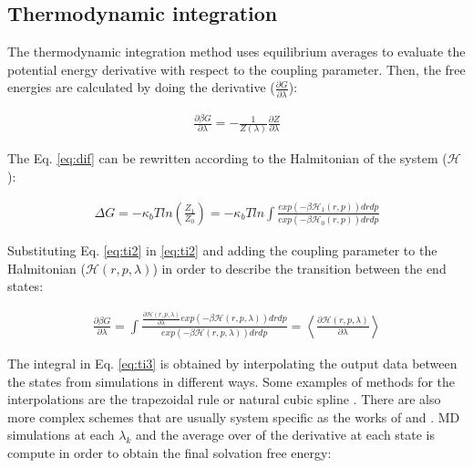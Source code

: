 \subsection{Thermodynamic integration}

The thermodynamic integration method \cite{kirkwood1935} uses equilibrium averages to evaluate the potential energy derivative with respect to the coupling parameter. Then, the free energies are calculated by  doing the derivative ($\frac{\partial G}{\partial \lambda} $):

\begin{equation}
\label{eq:ti1}
\begin{aligned}
	\frac{\partial \beta G}{\partial \lambda} = - \frac{1}{Z (\lambda)}\frac{\partial Z}{\partial \lambda}
\end{aligned}
\end{equation}

The Eq. \eqref{eq:dif} can be rewritten according to the Halmitonian of the system ($\mathcal{H}$):

\begin{equation}
\label{eq:ti2}
\begin{aligned}
\Delta G = - \kappa_{b}T ln \left( \frac{Z_{1}}{Z_{0}}\right) = -\kappa_{b}T ln \int \frac{exp(-\beta \mathcal{H} _{1}(r,p)) dr dp}{exp(-\beta \mathcal{H} _{0}(r,p)) dr dp}
\end{aligned}
\end{equation}

Substituting Eq. \eqref{eq:ti2} in \eqref{eq:ti2} and adding the coupling parameter to the Halmitonian ($\mathcal{H} (r,p,\lambda)$) in order to describe the transition between the end states:

\begin{equation}
\label{eq:ti3}
\begin{aligned}
\frac{\partial \beta G}{\partial \lambda} =  \int \frac{\frac{\partial \mathcal{H} (r,p,\lambda)}{\partial \lambda}exp(-\beta \mathcal{H}(r,p,\lambda)) dr dp}{exp(-\beta \mathcal{H}(r,p,\lambda)) dr dp} =  \left \langle \frac{\partial \mathcal{H}(r,p,\lambda)}{\partial \lambda} \right \rangle 
\end{aligned}
\end{equation}

The integral in Eq. \eqref{eq:ti3} is obtained by interpolating the output data between the states from simulations in different ways. Some examples of methods for the interpolations are the trapezoidal rule or natural cubic spline \cite{bareva}. There are also more complex schemes that are usually system specific as the works of  and . MD simulations at each $\lambda _{k}$ and the average over of the derivative at each state is compute in order to obtain the final solvation free energy:

